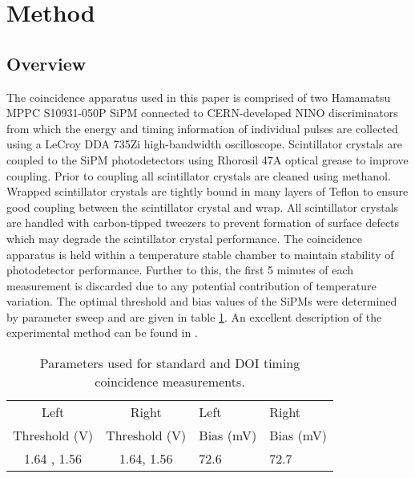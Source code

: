 \section{Method}
\subsection{Overview}
The coincidence apparatus used in this paper is comprised of two Hamamatsu MPPC S10931-050P SiPM connected to CERN-developed NINO discriminators from which the energy and timing information of individual pulses are collected using a LeCroy DDA 735Zi high-bandwidth oscilloscope. Scintillator crystals are coupled to the SiPM photodetectors using Rhorosil 47A optical grease to improve coupling. Prior to coupling all scintillator crystals are cleaned using methanol. Wrapped scintillator crystals are tightly bound in many layers of Teflon to ensure good coupling between the scintillator crystal and wrap. All scintillator crystals are handled with carbon-tipped tweezers to prevent formation of surface defects which may degrade the scintillator crystal performance. The coincidence apparatus is held within a temperature stable chamber to maintain stability of photodetector performance. Further to this, the first 5 minutes of each measurement is discarded due to any potential contribution of temperature variation. The optimal threshold and bias values of the SiPMs were determined by parameter sweep and are given in table \ref{tab:optimumparam}. An excellent description of the experimental method can be found in \cite{ch_Meyer_Pizzichemi_Lecoq_2013}.

\begin{table}
\caption{\label{tab:optimumparam} Parameters used for standard and DOI timing coincidence measurements.} 
\begin{tabular}{ccll}
\hline
Left &  Right & Left & Right\\
Threshold (V) & Threshold (V)& Bias (mV) & Bias (mV)\\
\hline
1.64 , 1.56 &  1.64, 1.56 &  72.6 &  72.7\\
\hline
\end{tabular}
\end{table}

